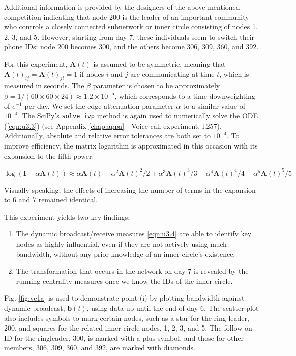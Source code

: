 Additional information is provided by the designers of the above mentioned competition indicating that node 200 is the leader of an important community who controls a closely connected subnetwork or inner circle consisting of nodes 1, 2, 3, and 5. However, starting from day 7, these individuals seem to switch their phone IDs: node 200 becomes 300, and the others become 306, 309, 360, and 392.

For this experiment, $\mathbf{A}(t)$ is assumed to be symmetric, meaning that $\mathbf{A}(t)_{ij} = \mathbf{A}(t)_{ji} = 1$ if nodes $i$ and $j$ are communicating at time $t$, which is measured in seconds. The $\beta$ parameter is chosen to be approximately $\beta = 1/(60\times 60 \times 24) \approx 1.2 \times 10^{-5}$, which corresponds to a time downweighting of $e^{-1}$ per day. We set the edge attenuation parameter $\alpha$ to a similar value of $10^{-4}$. The SciPy's \texttt{solve\_ivp} method is again used to numerically solve the ODE (\ref{eqn:u3.3}) (see Appendix \ref{chap:appa} - Voice call experiment, l.257). Additionally, absolute and relative error tolerances are both set to $10^{-4}$. To improve efficiency, the matrix logarithm is approximated in this occasion with its expansion to the fifth power:

$$\log(\mathbf{I} - \alpha \mathbf{A}(t)) \approx \alpha \mathbf{A}(t) - \alpha^2 \mathbf{A}(t)^2/2 + \alpha^3 \mathbf{A}(t)^3/3 - \alpha^4 \mathbf{A}(t)^4/4 + \alpha^5 \mathbf{A}(t)^5/5$$ 

Visually speaking, the effects of increasing the number of terms in the expansion to 6 and 7 remained identical.

This experiment yields two key findings:
\begin{enumerate}[label=(\roman*)]
  \item The dynamic broadcast/receive measures \eqref{eqn:u3.4} are able to identify key nodes as highly influential, even if they are not actively using much bandwidth, without any prior knowledge of an inner circle's existence.
  \item The transformation that occurs in the network on day 7 is revealed by the running centrality measures once we know the IDs of the inner circle.
\end{enumerate}

Fig. \ref{fig:ve1a} is used to demonstrate point (i) by plotting bandwidth against dynamic broadcast, $\mathbf{b}(t)$, using data up until the end of day 6. The scatter plot also includes symbols to mark certain nodes, such as a star for the ring leader, 200, and squares for the related inner-circle nodes, 1, 2, 3, and 5. The follow-on ID for the ringleader, 300, is marked with a plus symbol, and those for other members, 306, 309, 360, and 392, are marked with diamonds.

